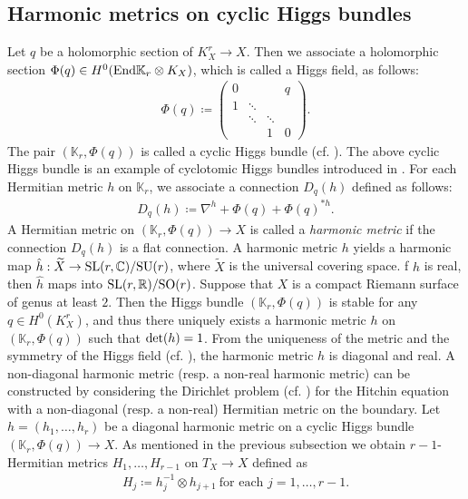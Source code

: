 \documentclass[12pt]{article}
\theoremstyle{definition}
\def\det{{\rm det}}
\def\SO{{\rm SO}}
\def\SL{{\rm SL}}
\def\SU{{\rm SU}}
\def\End{{\rm End}}
\def\det{{\rm det}}
\def\R{{\mathbb R}}
\def\C{{\mathbb C}}
\def\K{{\mathbb K}}
\begin{document}
\subsection{Harmonic metrics on cyclic Higgs bundles}\label{2.1}
Let $q$ be a holomorphic section of $K_X^r\rightarrow X$. Then we associate a holomorphic section $\Phi(q)\in H^0(\End \K_r\otimes K_X)$, which is called a Higgs field, as follows:
\begin{align*}
\Phi(q)\coloneqq 
\left(
\begin{array}{cccc}
0 & && q \\ 
1 & \ddots && \\ 
& \ddots & \ddots & \\ 
& & 1 & 0
\end{array}
\right).
\end{align*}
The pair $(\K_r,\Phi(q))$ is called a cyclic Higgs bundle (cf. \cite{Bar1, Hit1, Hit2}). The above cyclic Higgs bundle is an example of cyclotomic Higgs bundles introduced in \cite{Sim3}. For each Hermitian metric $h$ on $\K_r$, we associate a connection $D_q(h)$ defined as follows:
\begin{align*}
D_q(h)\coloneqq \nabla^h + \Phi(q) + \Phi(q)^{\ast h}.
\end{align*}
A Hermitian metric on $(\K_r,\Phi(q))\rightarrow X$ is called a {\it harmonic metric} if the connection $D_q(h)$ is a flat connection. A harmonic metric $h$ yields a harmonic map $\hat{h}: \widetilde{X}\rightarrow \SL(r,\C)/\SU(r)$, where $\widetilde{X}$ is the universal covering space. f $h$ is real, then $\hat{h}$ maps into $\SL(r,\R)/\SO(r)$. Suppose that $X$ is a compact Riemann surface of genus at least $2$. Then the Higgs bundle $(\K_r,\Phi(q))$ is stable for any $q\in H^0(K_X^r)$, and thus there uniquely exists a harmonic metric $h$ on $(\K_r,\Phi(q))$ such that $\det(h)=1$. From the uniqueness of the metric and the symmetry of the Higgs field (cf. \cite{Bar1, Hit2}), the harmonic metric $h$ is diagonal and real. A non-diagonal harmonic metric (resp. a non-real harmonic metric) can be constructed by considering the Dirichlet problem (cf. \cite{Don1, LM2}) for the Hitchin equation with a non-diagonal (resp. a non-real) Hermitian metric on the boundary. 
Let $h=(h_1,\dots, h_r)$ be a diagonal harmonic metric on a cyclic Higgs bundle $(\K_r,\Phi(q))\rightarrow X$. As mentioned in the previous subsection we obtain $r-1$-Hermitian metrics $H_1,\dots, H_{r-1}$ on $T_X\rightarrow X$ defined as
\begin{align*}
H_j\coloneqq h_j^{-1}\otimes h_{j+1} \ \text{for each $j=1,\dots,r -1$}.
\end{align*}
\end{document}
